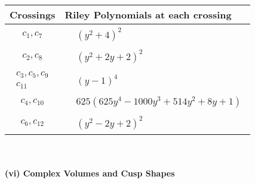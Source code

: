 \documentclass[1p]{elsarticle_modified}
\theoremstyle{definition}
\begin{document}
\begin{tabular}{m{50pt}|m{274pt}}
Crossings & \hspace{64pt}Riley Polynomials at each crossing \\
\hline $$\begin{aligned}c_{1},c_{7}\end{aligned}$$&$\begin{aligned}
&(y^2+4)^2
\end{aligned}$\\
\hline $$\begin{aligned}c_{2},c_{8}\end{aligned}$$&$\begin{aligned}
&(y^2+2 y+2)^2
\end{aligned}$\\
\hline $$\begin{aligned}c_{3},c_{5},c_{9}\\c_{11}\end{aligned}$$&$\begin{aligned}
&(y-1)^4
\end{aligned}$\\
\hline $$\begin{aligned}c_{4},c_{10}\end{aligned}$$&$\begin{aligned}
&625(625 y^4-1000 y^3+514 y^2+8 y+1)
\end{aligned}$\\
\hline $$\begin{aligned}c_{6},c_{12}\end{aligned}$$&$\begin{aligned}
&(y^2-2 y+2)^2
\end{aligned}$\\
\hline
\end{tabular}\\~\\
\newpage\flushleft \textbf{(vi) Complex Volumes and Cusp Shapes}
\end{document}
